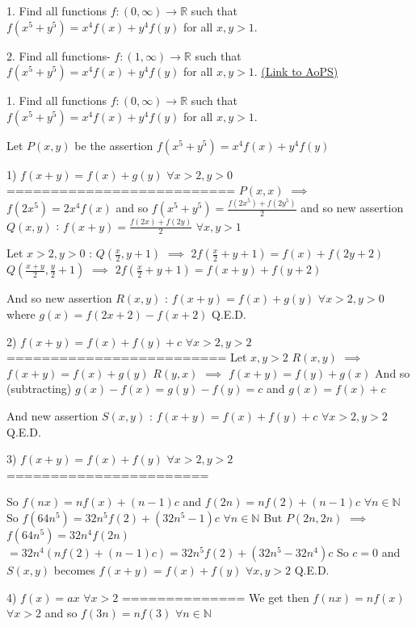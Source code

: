 \begin{problem}
	1. Find all functions $ f : (0,\infty) \to \mathbb R $ such that  $f(x^5+y^5)=x^4f(x)+y^4f(y)$ for all $x,y>1$.

2. Find all functions- $ f : (1,\infty) \to \mathbb R $ such that  $f(x^5+y^5)=x^4f(x)+y^4f(y)$ for all $x,y>1$.
	\flushright \href{https://artofproblemsolving.com/community/c6h444128}{(Link to AoPS)}
\end{problem}



\begin{solution}
	\begin{tcolorbox}1. Find all functions $ f : (0,\infty) \to \mathbb R $ such that  $f(x^5+y^5)=x^4f(x)+y^4f(y)$ for all $x,y>1$.
\end{tcolorbox}


Let $P(x,y)$ be the assertion $f(x^5+y^5)=x^4f(x)+y^4f(y)$

1) $f(x+y)=f(x)+g(y)$ $\forall x>2,y>0$
==========================
$P(x,x)$ $\implies$ $f(2x^5)=2x^4f(x)$ and so $f(x^5+y^5)=\frac{f(2x^5)+f(2y^5)}2$ and so new assertion $Q(x,y)$ : $f(x+y)=\frac{f(2x)+f(2y)}2$ $\forall x,y>1$

Let $x>2,y>0$ : 
$Q(\frac x2,y+1)$ $\implies$ $2f(\frac x2+y+1)=f(x)+f(2y+2)$
$Q(\frac{x+y}2,\frac y2+1)$ $\implies$ $2f(\frac x2+y+1)=f(x+y)+f(y+2)$

And so new assertion $R(x,y)$ : $f(x+y)=f(x)+g(y)$ $\forall x>2,y>0$ where $g(x)=f(2x+2)-f(x+2)$
Q.E.D.

2) $f(x+y)=f(x)+f(y)+c$ $\forall x>2,y>2$
=========================
Let $x,y>2$
$R(x,y)$ $\implies$ $f(x+y)=f(x)+g(y)$
$R(y,x)$ $\implies$ $f(x+y)=f(y)+g(x)$
And so (subtracting) $g(x)-f(x)=g(y)-f(y)=c$ and $g(x)=f(x)+c$ 

And new assertion $S(x,y)$ : $f(x+y)=f(x)+f(y)+c$ $\forall x>2,y>2$
Q.E.D.

3) $f(x+y)=f(x)+f(y)$ $\forall x>2,y>2$
=======================

So $f(nx)=nf(x)+(n-1)c$ and $f(2n)=nf(2)+(n-1)c$ $\forall n\in\mathbb N$
So $f(64n^5)=32n^5f(2)+(32n^5-1)c$ $\forall n\in\mathbb N$
But $P(2n,2n)$ $\implies$ $f(64n^5)=32n^4f(2n)$ $=32n^4(nf(2)+(n-1)c)=32n^5f(2)+(32n^5-32n^4)c$
So $c=0$ and $S(x,y)$ becomes $f(x+y)=f(x)+f(y)$ $\forall x,y>2$
Q.E.D.

4) $f(x)=ax$ $\forall x>2$
==============
We get then $f(nx)=nf(x)$ $\forall x>2$ and so $f(3n)=nf(3)$ $\forall n\in\mathbb N$


\end{solution}
